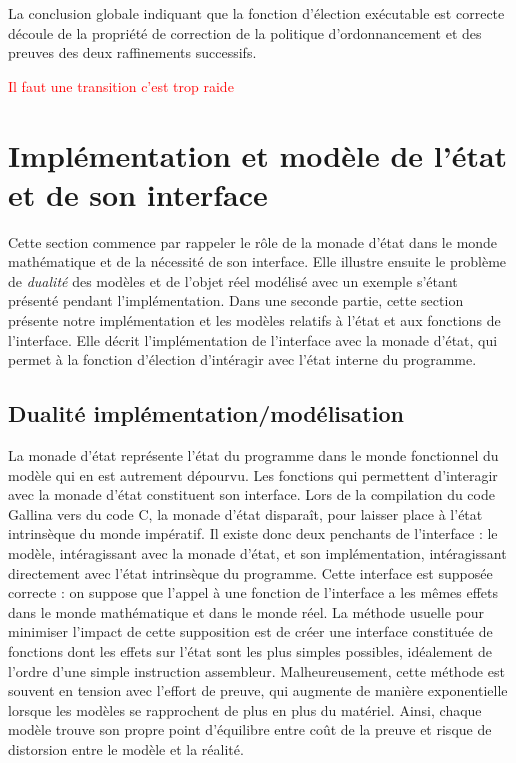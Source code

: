 	La conclusion globale indiquant que la fonction d'élection exécutable est correcte découle de la propriété de correction de la politique d'ordonnancement et des preuves des deux raffinements successifs.

	\textcolor{red}{Il faut une transition c'est trop raide}

	\section{Implémentation et modèle de l'état et de son interface}

	Cette section commence par rappeler le rôle de la monade d'état dans le monde mathématique et de la nécessité de son interface. Elle illustre ensuite le problème de \emph{dualité} des modèles et de l'objet réel modélisé avec un exemple s'étant présenté pendant l'implémentation.
	Dans une seconde partie, cette section présente notre implémentation et les modèles relatifs à l'état et aux fonctions de l'interface. Elle décrit l'implémentation de l'interface avec la monade d'état, qui permet à la fonction d'élection d'intéragir avec l'état interne du programme.
		\subsection{Dualité implémentation/modélisation}
		\label{sec:model_distortion}
			La monade d'état représente l'état du programme dans le monde fonctionnel du modèle qui en est autrement dépourvu. Les fonctions qui permettent d'interagir avec la monade d'état constituent son interface. Lors de la compilation du code Gallina vers du code C, la monade d'état disparaît, pour laisser place à l'état intrinsèque du monde impératif.
			Il existe donc deux penchants de l'interface : le modèle, intéragissant avec la monade d'état, et son implémentation, intéragissant directement avec l'état intrinsèque du programme. Cette interface est supposée correcte : on suppose que l'appel à une fonction de l'interface a les mêmes effets dans le monde mathématique et dans le monde réel. La méthode usuelle pour minimiser l'impact de cette supposition est de créer une interface constituée de fonctions dont les effets sur l'état sont les plus simples possibles, idéalement de l'ordre d'une simple instruction assembleur.
			Malheureusement, cette méthode est souvent en tension avec l'effort de preuve, qui augmente de manière exponentielle lorsque les modèles se rapprochent de plus en plus du matériel. Ainsi, chaque modèle trouve son propre point d'équilibre entre coût de la preuve et risque de distorsion entre le modèle et la réalité.

